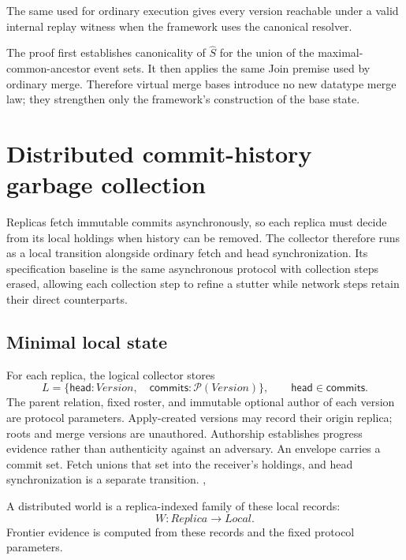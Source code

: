\begin{theorem}
The same  used for ordinary execution gives every version
reachable under  a valid internal replay witness when the framework
uses the canonical resolver.
\hfill{}
\end{theorem}

The proof first establishes canonicality of $\widehat S$ for the union of the
maximal-common-ancestor event sets. It then applies the same Join premise used
by ordinary merge.
Therefore virtual merge bases introduce no new datatype merge law; they strengthen
only the framework's construction of the base state.

\section{Distributed commit-history garbage collection}

Replicas fetch immutable commits asynchronously, so each replica must decide
from its local holdings when history can be removed. The collector therefore
runs as a local transition alongside ordinary fetch and head synchronization.
Its specification baseline is the same asynchronous protocol with collection
steps erased, allowing each collection step to refine a stutter while network
steps retain their direct counterparts.

\subsection{Minimal local state}

For each replica, the logical collector stores
\[
  L=\{\mathsf{head}:\mathit{Version},\quad
      \mathsf{commits}:\mathcal P(\mathit{Version})\},
  \qquad \mathsf{head}\in\mathsf{commits}.
\]
The parent relation, fixed roster, and immutable optional author of each
version are protocol parameters. Apply-created versions may record their
origin replica; roots and merge versions are unauthored. Authorship establishes
progress evidence rather than authenticity against an adversary. An envelope
carries a commit set. Fetch unions that set into the receiver's holdings, and
head synchronization is a separate transition.
\hfill{}, 

A distributed world is a replica-indexed family of these local records:
\[
  W:\mathit{Replica}\to\mathit{Local}.
\]
Frontier evidence is computed from these records and the fixed protocol
parameters.

